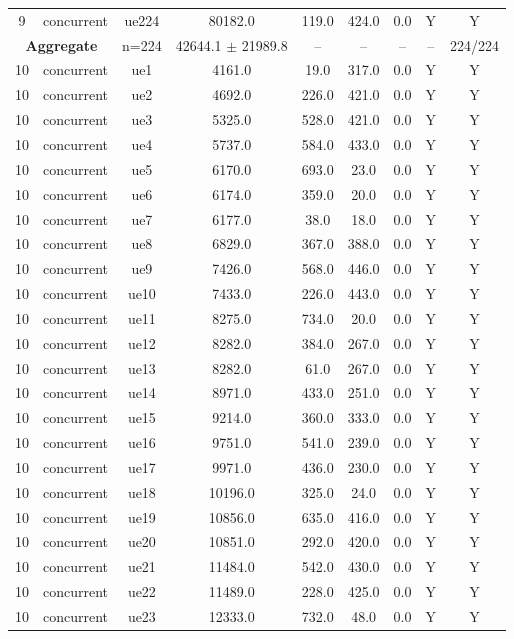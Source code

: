 \begin{table}[ht]
\begin{tabular}{|c|c|c|c|c|c|c|c|c|}
9 & concurrent & ue224 & 80182.0 & 119.0 & 424.0 & 0.0 & Y & Y \\
\multicolumn{2}{|c|}{\textbf{Aggregate}} & n=224 & 42644.1 $\pm$ 21989.8 & -- & -- & -- & -- & 224/224 \\
\hline
10 & concurrent & ue1 & 4161.0 & 19.0 & 317.0 & 0.0 & Y & Y \\
10 & concurrent & ue2 & 4692.0 & 226.0 & 421.0 & 0.0 & Y & Y \\
10 & concurrent & ue3 & 5325.0 & 528.0 & 421.0 & 0.0 & Y & Y \\
10 & concurrent & ue4 & 5737.0 & 584.0 & 433.0 & 0.0 & Y & Y \\
10 & concurrent & ue5 & 6170.0 & 693.0 & 23.0 & 0.0 & Y & Y \\
10 & concurrent & ue6 & 6174.0 & 359.0 & 20.0 & 0.0 & Y & Y \\
10 & concurrent & ue7 & 6177.0 & 38.0 & 18.0 & 0.0 & Y & Y \\
10 & concurrent & ue8 & 6829.0 & 367.0 & 388.0 & 0.0 & Y & Y \\
10 & concurrent & ue9 & 7426.0 & 568.0 & 446.0 & 0.0 & Y & Y \\
10 & concurrent & ue10 & 7433.0 & 226.0 & 443.0 & 0.0 & Y & Y \\
10 & concurrent & ue11 & 8275.0 & 734.0 & 20.0 & 0.0 & Y & Y \\
10 & concurrent & ue12 & 8282.0 & 384.0 & 267.0 & 0.0 & Y & Y \\
10 & concurrent & ue13 & 8282.0 & 61.0 & 267.0 & 0.0 & Y & Y \\
10 & concurrent & ue14 & 8971.0 & 433.0 & 251.0 & 0.0 & Y & Y \\
10 & concurrent & ue15 & 9214.0 & 360.0 & 333.0 & 0.0 & Y & Y \\
10 & concurrent & ue16 & 9751.0 & 541.0 & 239.0 & 0.0 & Y & Y \\
10 & concurrent & ue17 & 9971.0 & 436.0 & 230.0 & 0.0 & Y & Y \\
10 & concurrent & ue18 & 10196.0 & 325.0 & 24.0 & 0.0 & Y & Y \\
10 & concurrent & ue19 & 10856.0 & 635.0 & 416.0 & 0.0 & Y & Y \\
10 & concurrent & ue20 & 10851.0 & 292.0 & 420.0 & 0.0 & Y & Y \\
10 & concurrent & ue21 & 11484.0 & 542.0 & 430.0 & 0.0 & Y & Y \\
10 & concurrent & ue22 & 11489.0 & 228.0 & 425.0 & 0.0 & Y & Y \\
10 & concurrent & ue23 & 12333.0 & 732.0 & 48.0 & 0.0 & Y & Y \\

\end{tabular}
\end{table}
